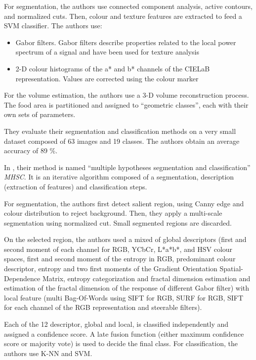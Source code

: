 For segmentation, the authors use connected component analysis, active contours, and normalized cuts. Then, colour and texture features are extracted to feed a SVM classifier. The authors use:
\begin{itemize}
    \item Gabor filters. Gabor filters describe properties related to the local power spectrum of a signal and have been used for texture analysis
    \item 2-D colour histograms of the a* and b* channels of the CIELaB representation. Values are corrected using the colour marker
\end{itemize}
For the volume estimation, the authors use a 3-D volume reconstruction process. The food area is partitioned and assigned to \enquote{geometric classes}, each with their own sets of parameters.

They evaluate their segmentation and classification methods on a very small dataset composed of 63 images and 19 classes. The authors obtain an average accuracy of 89 \%.

In \cite{Zhu2015}, their method is named \enquote{multiple hypotheses segmentation and classification} \textit{MHSC}. It is an iterative algorithm composed of a segmentation, description (extraction of features) and classification steps.

For segmentation, the authors first detect salient region, using Canny edge and colour distribution to reject background. Then, they apply a multi-scale segmentation using normalized cut. Small segmented regions are discarded.

On the selected region, the authors used a mixed of global descriptors (first and second moment of each channel for RGB, YCbCr, L*a*b*, and HSV colour spaces, first and second moment of the entropy in RGB, predominant colour descriptor, entropy and two first moments of the Gradient Orientation Spatial-Dependence Matrix, entropy categorization and fractal dimension estimation and estimation of the fractal dimension of the response of different Gabor filter) with local feature (multi Bag-Of-Words using SIFT for RGB, SURF for RGB, SIFT for each channel of the RGB representation and steerable filters).

Each of the 12 descriptor, global and local, is classified independently and assigned a confidence score. A late fusion function (either maximum confidence score or majority vote) is used  to decide the final class. For classification, the authors use K-NN and SVM.

